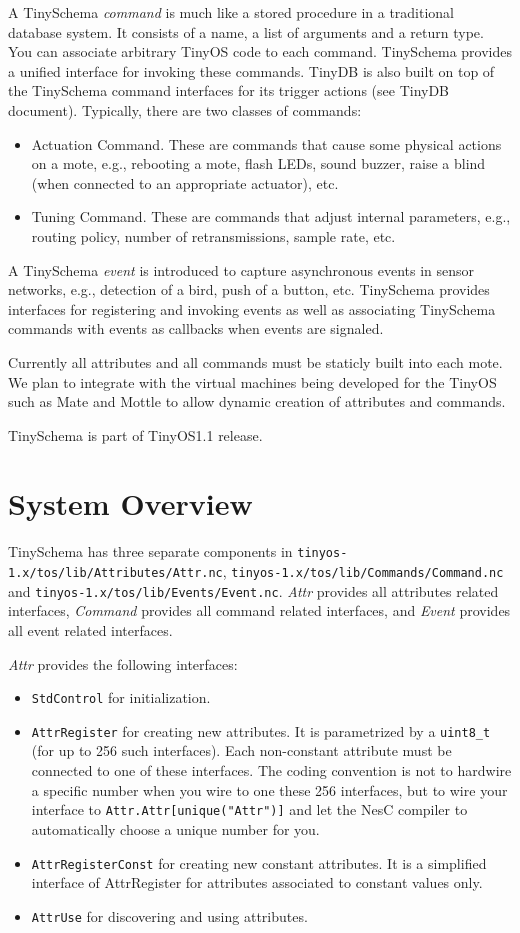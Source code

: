 \documentclass[11pt]{article}
\newcommand{\docroot}{tinyos-1.x}
\begin{document}
A TinySchema {\em command} is much like a stored procedure in a traditional
database system.  It consists of a name, a list of arguments and a return
type.  You can associate arbitrary TinyOS code to each command.
TinySchema provides a unified interface for invoking these commands.
TinyDB is also built on top of the TinySchema command interfaces for
its trigger actions (see TinyDB document).  Typically, there are two
classes of commands:
\begin{itemize}
\item Actuation Command.  These are commands that cause some physical
actions on a mote, e.g., rebooting a mote, flash LEDs, sound buzzer,
raise a blind (when connected to an appropriate actuator), etc.
\item Tuning Command.  These are commands that adjust internal parameters,
e.g., routing policy, number of retransmissions, sample rate, etc.
\end{itemize}

A TinySchema {\em event} is introduced to capture asynchronous
events in sensor networks, e.g., detection of a bird, push of a button, etc.
TinySchema provides interfaces for registering and invoking events as well
as associating TinySchema commands with events as callbacks when events
are signaled.

Currently all attributes and all commands must be staticly built
into each mote.  We plan to integrate with the virtual machines being
developed for the TinyOS such as Mate and Mottle to allow dynamic
creation of attributes and commands.

TinySchema is part of TinyOS1.1 release.

\section{System Overview}

TinySchema has three separate components in {\tt \docroot/tos/lib/Attributes/Attr.nc},
{\tt \docroot/tos/lib/Commands/Command.nc} 
and {\tt \docroot/tos/lib/Events/Event.nc}.  
{\em Attr} provides all attributes
related interfaces, {\em Command} provides all command related interfaces,
and {\em Event} provides all event related interfaces.

{\em Attr} provides the following interfaces:
\begin{itemize}
\item {\tt StdControl} for initialization.
\item {\tt AttrRegister} for creating new attributes.  It is parametrized
by a {\tt uint8\_t} (for up to 256 such interfaces).  Each non-constant attribute must be
connected to one of these interfaces.  The coding convention is not
to hardwire a specific number when you wire to one these 256 interfaces, but
to wire your interface to {\tt Attr.Attr[unique("Attr")]} and let
the NesC compiler to automatically choose a unique number for you.
\item {\tt AttrRegisterConst} for creating new constant attributes.  It is a
simplified interface of AttrRegister for attributes associated to 
constant values only.
\item {\tt AttrUse} for discovering and using attributes.
\end{itemize}
\end{document}
